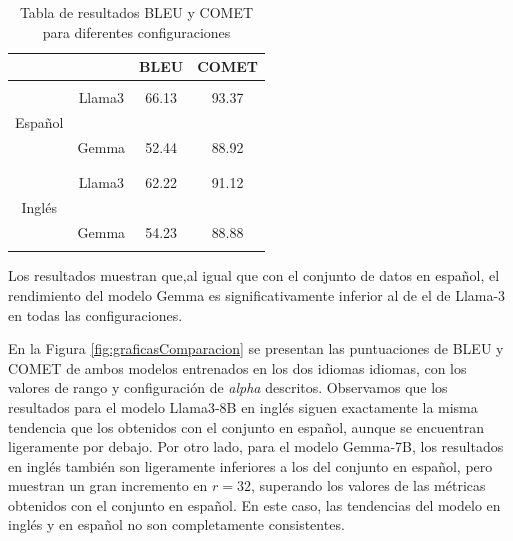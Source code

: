 \documentclass[11pt,spanish,listoffigures,listoftables]{tfgetsinf}
\begin{document}
\begin{table}[h]
\centering
\begin{tabular}{c  c | c c}

             &  & BLEU & COMET \\ 
\hline
\hline
& & & \\
 & Llama3  &   66.13   &   93.37    \\
Español &  &      &       \\
 & Gemma   &   52.44   &    88.92   \\
& & & \\
\hline
& & &  \\
 & Llama3  & 62.22    &   91.12    \\
Inglés &  &      &       \\
 & Gemma   &  54.23    &    88.88   \\
& & &  \\
\end{tabular}
\caption{Tabla de resultados BLEU y COMET para diferentes configuraciones}
\end{table}


Los resultados muestran que,al igual que con el conjunto de datos en español, el rendimiento del modelo Gemma es significativamente inferior al de el de Llama-3 en todas las configuraciones.

En la Figura \ref{fig:graficasComparacion} se presentan las puntuaciones de BLEU y COMET de ambos modelos entrenados en los dos idiomas idiomas, con los valores de rango y configuración de \textit{alpha} descritos. Observamos que los resultados para el modelo Llama3-8B en inglés siguen exactamente la misma tendencia que los obtenidos con el conjunto en español, aunque se encuentran ligeramente por debajo. Por otro lado, para el modelo Gemma-7B, los resultados en inglés también son ligeramente inferiores a los del conjunto en español, pero muestran un gran incremento en $r = 32$, superando los valores de las métricas obtenidos con el conjunto en español. En este caso, las tendencias del modelo en inglés y en español no son completamente consistentes.

\end{document}
